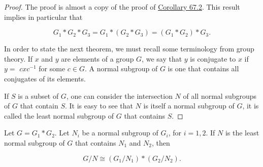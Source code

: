 \begin{proof}
The proof is almost a copy of the proof of \hyperref[cor:67.2]{Corollary 67.2}.
This result implies in particular that

\[
G_{1} * G_{2} * G_{3} = G_{1} * ( {G_{2} * G_{3}}) = ( {G_{1} * G_{2}}) * G_{3}.
\]

In order to state the next theorem, we must recall some terminology from group theory. If \(x\) and \(y\) are elements of a group \(G\), we say that \(y\) is conjugate to \(x\) if \(y =\) \({cx}c^{-1}\) for some \(c \in G\). A normal subgroup of \(G\) is one that contains all conjugates of its elements.

If \(S\) is a subset of \(G\), one can consider the intersection \(N\) of all normal subgroups of \(G\) that contain \(S\). It is easy to see that \(N\) is itself a normal subgroup of \(G\), it is called the least normal subgroup of \(G\) that contains \(S\).
\end{proof}
\begin{theorem}
\label{thm:\thetheorem}
Let \(G = G_{1} * G_{2}\). Let \(N_{i}\) be a normal subgroup of \(G_{i}\), for \(i = 1,2\). If \(N\) is the least normal subgroup of \(G\) that contains \(N_{1}\) and \(N_{2}\), then

\[
G/N \cong ( {G_{1}/N_{1}}) * ( {G_{2}/N_{2}}) \text{.}
\]
\end{theorem}

